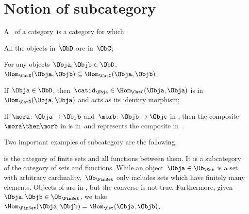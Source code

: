 \label{sec:specialization}


\section{Notion of subcategory}
\begin{ctdefinition}[Subcategory]
  \label{def:subcategory}
  A \emph{}~\CatD of a category~\CatC is a category for which:
  \begin{compactenum}
    \item All the objects in~$\ObD$ are in~$\ObC$;
    \item For any objects~$\Obja,\Objb\in \ObD$,~$\Hom_\CatD(\Obja,\Objb)\subseteq \Hom_\CatC(\Obja,\Objb)$;
    \item If~$\Obja\in \ObD$, then~$\catid_\Obja \in \Hom_\CatC(\Obja,\Obja)$ is in~$\Hom_\CatD(\Obja,\Obja)$ and acts as its identity morphism;
    \item If~$\mora \colon \Obja \to \Objb$ and~$\morb\colon \Objb\to \Objc$ in \CatD, then the composite~$\mora \then \morb$ in \CatC is in~\CatD and represents the composite in~\CatD.
  \end{compactenum}
\end{ctdefinition}

Two important examples of subcategory are the following.

\begin{example}
  \label{ex:FinSet}
  \iindex{\FinSet} is the category of finite sets and all functions between them. It is a subcategory of the category \Set of sets and functions. While an object~$\Obja \in \Ob_\Set$ is a set with arbitrary cardinality,~$\Ob_{\FinSet}$ only includes sets which have finitely many elements. Objects of \FinSet are in \Set, but the converse is not true. Furthermore, given~$\Obja,\Objb\in \Ob_\FinSet$, we take~$\Hom_{\FinSet}(\Obja,\Objb)=\Hom_{\Set}(\Obja,\Objb)$.
\end{example}


